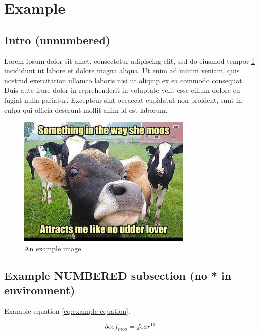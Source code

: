\newpage
\section{Example}
\vspace{-3mm}

\subsection*{Intro (unnumbered)}

Lorem ipsum dolor sit amet, consectetur adipiscing elit, sed do eiusmod tempor \ref{fig:example-image} incididunt ut labore et dolore magna aliqua. Ut enim ad minim veniam, quis nostrud exercitation ullamco laboris nisi ut aliquip ex ea commodo consequat. Duis aute irure dolor in reprehenderit in voluptate velit esse cillum dolore eu fugiat nulla pariatur. Excepteur sint occaecat cupidatat non proident, sunt in culpa qui officia deserunt mollit anim id est laborum.

\begin{figure}[h]
    \centering
    \includegraphics[width=0.75\textwidth]{will/example-image.jpg}
    \hfill
    \caption{An example image \citet{E-Cannon2022}}
    \label{fig:example-image}
\end{figure}

\vspace{-10mm}
\subsection{Example NUMBERED subsection (no * in environment)}
\vspace{-3mm}

Example equation \ref{eq:example-equation}.

\begin{equation}
    beef_{moo} = fear^{10}
    \label{eq:example-equation}
\end{equation}

